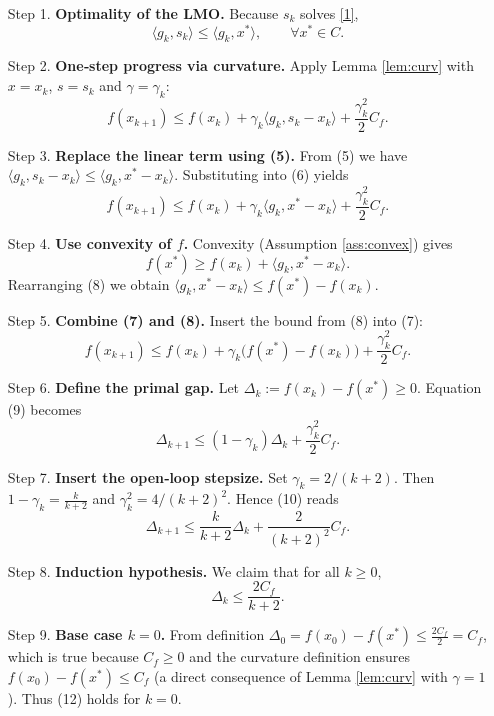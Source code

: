 \documentclass{article}
\newcommand{\inner}[2]{\langle #1,#2\rangle}
\begin{document}
\begin{enumerate}
\item[Step 1.] \textbf{Optimality of the LMO.}  
Because $s_{k}$ solves \eqref{1},
\[
\inner{g_{k}}{s_{k}} \le \inner{g_{k}}{x^{*}},\qquad\forall x^{*}\in C.
\tag{5}
\]

\item[Step 2.] \textbf{One‑step progress via curvature.}  
Apply Lemma \ref{lem:curv} with $x=x_{k}$, $s=s_{k}$ and $\gamma=\gamma_{k}$:
\[
f(x_{k+1})\le f(x_{k})+\gamma_{k}\inner{g_{k}}{s_{k}-x_{k}}+\frac{\gamma_{k}^{2}}{2}C_{f}.
\tag{6}
\]

\item[Step 3.] \textbf{Replace the linear term using (5).}  
From (5) we have $\inner{g_{k}}{s_{k}-x_{k}}\le\inner{g_{k}}{x^{*}-x_{k}}$. Substituting into (6) yields
\[
f(x_{k+1})\le f(x_{k})+\gamma_{k}\inner{g_{k}}{x^{*}-x_{k}}+\frac{\gamma_{k}^{2}}{2}C_{f}.
\tag{7}
\]

\item[Step 4.] \textbf{Use convexity of $f$.}  
Convexity (Assumption \ref{ass:convex}) gives
\[
f(x^{*})\ge f(x_{k})+\inner{g_{k}}{x^{*}-x_{k}}.
\tag{8}
\]
Rearranging (8) we obtain $\inner{g_{k}}{x^{*}-x_{k}}\le f(x^{*})-f(x_{k})$.

\item[Step 5.] \textbf{Combine (7) and (8).}  
Insert the bound from (8) into (7):
\[
f(x_{k+1})\le f(x_{k})+\gamma_{k}\bigl(f(x^{*})-f(x_{k})\bigr)+\frac{\gamma_{k}^{2}}{2}C_{f}.
\tag{9}
\]

\item[Step 6.] \textbf{Define the primal gap.}  
Let $\Delta_{k}:=f(x_{k})-f(x^{*})\ge0$.  
Equation (9) becomes
\[
\Delta_{k+1}\le (1-\gamma_{k})\Delta_{k}+\frac{\gamma_{k}^{2}}{2}C_{f}.
\tag{10}
\]

\item[Step 7.] \textbf{Insert the open‑loop stepsize.}  
Set $\gamma_{k}=2/(k+2)$. Then $1-\gamma_{k}= \frac{k}{k+2}$ and $\gamma_{k}^{2}=4/(k+2)^{2}$. Hence (10) reads
\[
\Delta_{k+1}\le\frac{k}{k+2}\Delta_{k}+\frac{2}{(k+2)^{2}}C_{f}.
\tag{11}
\]

\item[Step 8.] \textbf{Induction hypothesis.}  
We claim that for all $k\ge0$,
\[
\Delta_{k}\le\frac{2C_{f}}{k+2}.
\tag{12}
\]

\item[Step 9.] \textbf{Base case $k=0$.}  
From definition $\Delta_{0}=f(x_{0})-f(x^{*})\le \frac{2C_{f}}{2}=C_{f}$, which is true because $C_{f}\ge0$ and the curvature definition ensures $f(x_{0})-f(x^{*})\le C_{f}$ (a direct consequence of Lemma \ref{lem:curv} with $\gamma=1$). Thus (12) holds for $k=0$.


\end{enumerate}
\end{document}
